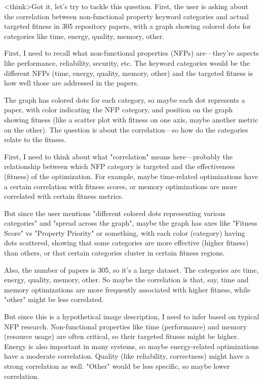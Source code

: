 <think>Got it, let's try to tackle this question. First, the user is asking about the correlation between non-functional property keyword categories and actual targeted fitness in 305 repository papers, with a graph showing colored dots for categories like time, energy, quality, memory, other. 

First, I need to recall what non-functional properties (NFPs) are—they're aspects like performance, reliability, security, etc. The keyword categories would be the different NFPs (time, energy, quality, memory, other) and the targeted fitness is how well those are addressed in the papers. 

The graph has colored dots for each category, so maybe each dot represents a paper, with color indicating the NFP category, and position on the graph showing fitness (like a scatter plot with fitness on one axis, maybe another metric on the other). The question is about the correlation—so how do the categories relate to the fitness. 

First, I need to think about what "correlation" means here—probably the relationship between which NFP category is targeted and the effectiveness (fitness) of the optimization. For example, maybe time-related optimizations have a certain correlation with fitness scores, or memory optimizations are more correlated with certain fitness metrics. 

But since the user mentions "different colored dots representing various categories" and "spread across the graph", maybe the graph has axes like "Fitness Score" vs "Property Priority" or something, with each color (category) having dots scattered, showing that some categories are more effective (higher fitness) than others, or that certain categories cluster in certain fitness regions. 

Also, the number of papers is 305, so it's a large dataset. The categories are time, energy, quality, memory, other. So maybe the correlation is that, say, time and memory optimizations are more frequently associated with higher fitness, while "other" might be less correlated. 

But since this is a hypothetical image description, I need to infer based on typical NFP research. Non-functional properties like time (performance) and memory (resource usage) are often critical, so their targeted fitness might be higher. Energy is also important in many systems, so maybe energy-related optimizations have a moderate correlation. Quality (like reliability, correctness) might have a strong correlation as well. "Other" would be less specific, so maybe lower correlation. 

